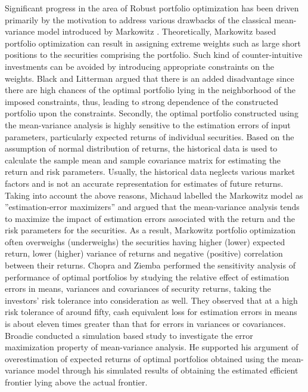 \documentclass[12pt]{article}
\numberwithin{equation}{section}
\begin{document}
Significant progress in the area of Robust portfolio optimization has been driven primarily by the motivation to address various drawbacks of the classical mean-variance model introduced by Markowitz \cite{Markowitz1,Markowitz2}. Theoretically, Markowitz based portfolio optimization can result in assigning extreme weights such as large short positions to the securities comprising the portfolio. Such kind of counter-intuitive investments can be avoided by introducing appropriate constraints on the weights. Black and Litterman \cite{Black} argued that there is an added disadvantage since there are high chances of the optimal portfolio lying in the neighborhood of the imposed constraints, thus, leading to strong dependence of the constructed portfolio upon the constraints. Secondly, the optimal portfolio constructed using the mean-variance analysis is highly sensitive to the estimation errors of input parameters, particularly expected returns of individual securities. Based on the assumption of normal distribution of returns, the historical data is used to calculate the sample mean and sample covariance matrix for estimating the return and risk parameters. Usually, the historical data neglects various market factors and is not an accurate representation for estimates of future returns. Taking into account the above reasons, Michaud \cite{Michaud} labelled the Markowitz model as ''estimation-error maximizers'' and argued that the mean-variance analysis tends to maximize the impact of estimation errors associated with the return and the risk parameters for the securities. As a result, Markowitz portfolio optimization often overweighs (underweighs) the securities having higher (lower) expected return, lower (higher) variance of returns and negative (positive) correlation between their returns. Chopra and Ziemba \cite{Chopra} performed the sensitivity analysis of performance of optimal portfolios by studying the relative effect of estimation errors in means, variances and covariances of security returns, taking the investors' risk tolerance into consideration as well. They observed that at a high risk tolerance of around fifty, cash equivalent loss for estimation errors in means is about eleven times greater than that for errors in variances or covariances. Broadie \cite{Broadie} conducted a simulation based study to investigate the error maximization property of mean-variance analysis. He supported his argument of overestimation of expected returns of optimal portfolios obtained using the mean-variance model through his simulated results of obtaining the estimated efficient frontier lying above the actual frontier. 
\end{document}
